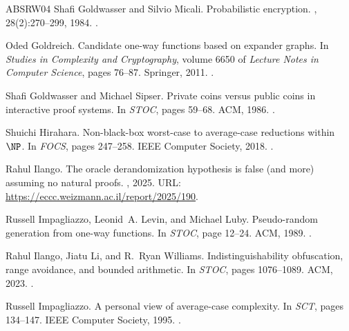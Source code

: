 \documentclass[10pt,a4paper]{article}
\theoremstyle{definition}
\theoremstyle{remark}
\begin{document}
\begin{thebibliography}{ABSRW04}
Shafi Goldwasser and Silvio Micali.
\newblock Probabilistic encryption.
, 28(2):270--299, 1984.
\newblock \href {https://doi.org/10.1016/0022-0000(84)90070-9}
  {}.

Oded Goldreich.
\newblock Candidate one-way functions based on expander graphs.
\newblock In {\em Studies in Complexity and Cryptography}, volume 6650 of {\em
  Lecture Notes in Computer Science}, pages 76--87. Springer, 2011.
\newblock \href {https://doi.org/10.1007/978-3-642-22670-0\_10}
  {}.

Shafi Goldwasser and Michael Sipser.
\newblock Private coins versus public coins in interactive proof systems.
\newblock In {\em {STOC}}, pages 59--68. {ACM}, 1986.
\newblock \href {https://doi.org/10.1145/12130.12137}
  {}.

Shuichi Hirahara.
\newblock Non-black-box worst-case to average-case reductions within {$\NP$}.
\newblock In {\em {FOCS}}, pages 247--258. {IEEE} Computer Society, 2018.
\newblock \href {https://doi.org/10.1109/FOCS.2018.00032}
  {}.

Rahul Ilango.
\newblock The oracle derandomization hypothesis is false (and more) assuming no
  natural proofs.
, 2025.
\newblock URL: \url{https://eccc.weizmann.ac.il/report/2025/190}.

Russell Impagliazzo, Leonid~A. Levin, and Michael Luby.
\newblock Pseudo-random generation from one-way functions.
\newblock In {\em {STOC}}, page 12–24. ACM, 1989.
\newblock \href {https://doi.org/10.1145/73007.73009}
  {}.

Rahul Ilango, Jiatu Li, and R.~Ryan Williams.
\newblock Indistinguishability obfuscation, range avoidance, and bounded
  arithmetic.
\newblock In {\em {STOC}}, pages 1076--1089. {ACM}, 2023.
\newblock \href {https://doi.org/10.1145/3564246.3585187}
  {}.

Russell Impagliazzo.
\newblock A personal view of average-case complexity.
\newblock In {\em {SCT}}, pages 134--147. {IEEE} Computer Society, 1995.
\newblock \href {https://doi.org/10.1109/SCT.1995.514853}
  {}.


\end{thebibliography}
\end{document}
